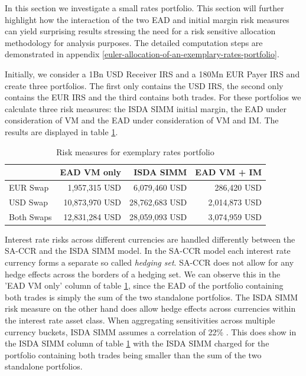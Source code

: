 \documentclass[../Thesis_AHoecherl.tex]{subfiles}
\begin{document}
    In this section we investigate a small rates portfolio. This section will further highlight how the interaction of the two \gls{EAD} and initial margin risk measures can yield surprising results stressing the need for a risk sensitive allocation methodology for analysis purposes. The detailed computation steps are demonstrated in appendix \ref{euler-allocation-of-an-exemplary-rates-portfolio}.

    Initially, we consider a 1Bn USD Receiver \gls{IRS} and a 180Mn EUR Payer \gls{IRS} and create three portfolios. The first only contains the USD \gls{IRS}, the second only contains the EUR \gls{IRS} and the third contains both trades.
    For these portfolios we calculate three risk measures: the \gls{ISDA SIMM} initial margin, the \gls{EAD} under consideration of \gls{VM} and the \gls{EAD} under consideration of \gls{VM} and IM. The results are displayed in table \ref{tab:2TradeRatesResults}.

    \begin{table}[htbp]
        \centering
        \begin{tabular}{l||r|r|r}
                & \gls{EAD} \gls{VM} only &\gls{ISDA SIMM} & \gls{EAD} \gls{VM} + \gls{IM} \\
                \toprule
        EUR Swap & 1,957,315 USD & 6,079,460 USD & 286,420 USD \\
        USD Swap & 10,873,970 USD & 28,762,683 USD & 2,014,873 USD \\
        Both Swaps & 12,831,284 USD & 28,059,093 USD & 3,074,959 USD \\
        \end{tabular}%
        \caption{Risk measures for exemplary rates portfolio}
        \label{tab:2TradeRatesResults}%
    \end{table}%

    Interest rate risks across different currencies are handled differently between the \gls{SA-CCR} and the \gls{ISDA SIMM} model.
    In the \gls{SA-CCR} model each interest rate currency forms a separate so called \emph{hedging set}. \gls{SA-CCR} does not allow for any hedge effects across the borders of a hedging set.
    We can observe this in the 'EAD \gls{VM} only' column of table \ref{tab:2TradeRatesResults}, since the \gls{EAD} of the portfolio containing both trades is simply the sum of the two standalone portfolios.
    The \gls{ISDA SIMM} risk measure on the other hand does allow hedge effects across currencies within the interest rate asset class. When aggregating sensitivities across multiple currency buckets, \gls{ISDA SIMM} assumes a correlation of 22\% \cite[Section D.2]{SIMM}.
    This does show in the \gls{ISDA SIMM} column of table \ref{tab:2TradeRatesResults} with the \gls{ISDA SIMM} charged for the portfolio containing both trades being smaller than the sum of the two standalone portfolios.
    
\end{document}
